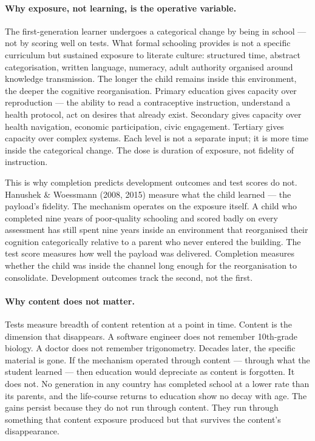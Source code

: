 \documentclass[12pt,letterpaper]{article}
\begin{document}
\paragraph{Why exposure, not learning, is the operative variable.}

The first-generation learner undergoes a categorical change by being in
school --- not by scoring well on tests. What formal schooling provides
is not a specific curriculum but sustained exposure to literate culture:
structured time, abstract categorisation, written language, numeracy,
adult authority organised around knowledge transmission. The longer the
child remains inside this environment, the deeper the cognitive
reorganisation. Primary education gives capacity over reproduction ---
the ability to read a contraceptive instruction, understand a health
protocol, act on desires that already exist. Secondary gives capacity
over health navigation, economic participation, civic engagement.
Tertiary gives capacity over complex systems. Each level is not a
separate input; it is more time inside the categorical change. The dose
is duration of exposure, not fidelity of instruction.

This is why completion predicts development outcomes and test scores do
not. Hanushek \& Woessmann (2008, 2015) measure what the child learned
--- the payload's fidelity. The mechanism operates on the exposure
itself. A child who completed nine years of poor-quality schooling and
scored badly on every assessment has still spent nine years inside an
environment that reorganised their cognition categorically relative to a
parent who never entered the building. The test score measures how well
the payload was delivered. Completion measures whether the child was
inside the channel long enough for the reorganisation to consolidate.
Development outcomes track the second, not the first.

\paragraph{Why content does not matter.}

Tests measure breadth of content retention at a point in time. Content is
the dimension that disappears. A software engineer does not remember
10th-grade biology. A doctor does not remember trigonometry. Decades
later, the specific material is gone. If the mechanism operated through
content --- through what the student learned --- then education would
depreciate as content is forgotten. It does not. No generation in any
country has completed school at a lower rate than its parents, and the
life-course returns to education show no decay with age. The gains
persist because they do not run through content. They run through
something that content exposure produced but that survives the content's
disappearance.
\end{document}
